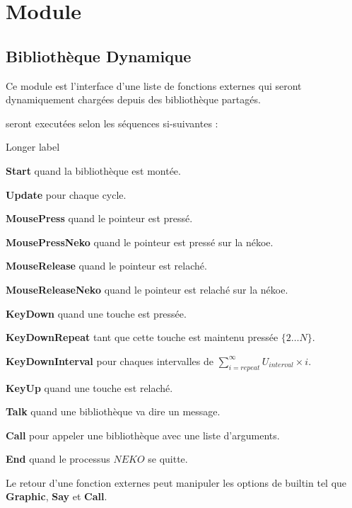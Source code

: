 \documentclass{report}
\newcommand{\program}{\textit{NEKO}}
\begin{document}
\section{Module}



\subsection{Bibliothèque Dynamique}

Ce module est l'interface d'une liste de fonctions externes qui seront dynamiquement chargées depuis des bibliothèque partagés.

seront executées selon les séquences si-suivantes :

\begin{labeling}{Longer label\quad}
	\item[\textbf{Start} quand la bibliothèque est montée.]
	\item[\textbf{Update} pour chaque cycle.]
	\item[\textbf{MousePress} quand le pointeur est pressé.]
	\item[\textbf{MousePressNeko} quand le pointeur est pressé sur la nékoe.]
	\item[\textbf{MouseRelease} quand le pointeur est relaché.]
	\item[\textbf{MouseReleaseNeko} quand le pointeur est relaché sur la nékoe.]
	\item[\textbf{KeyDown} quand une touche est pressée.]
	\item[\textbf{KeyDownRepeat} tant que cette touche est maintenu pressée $\{2\dots{}N\}$.]
	\item[\textbf{KeyDownInterval} pour chaques intervalles de $\sum_{i=repeat}^{\infty} U_{interval}\times{}i$.]
	\item[\textbf{KeyUp} quand une touche est relaché.]
	\item[\textbf{Talk} quand une bibliothèque va dire un message.]
	\item[\textbf{Call} pour appeler une bibliothèque avec une liste d'arguments.]
	\item[\textbf{End} quand le processus $\program$ se quitte.]
\end{labeling}

Le retour d'une fonction externes peut manipuler les options de builtin tel que \textbf{Graphic}, \textbf{Say} et \textbf{Call}.
\end{document}
